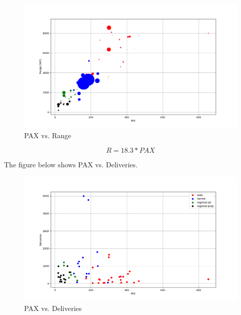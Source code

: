 \documentclass[12pt]{article} %
\begin{document}
\begin{figure}[h]
\begin{center}
\includegraphics[width=1\textwidth]{pax_v_range}
\end{center}
\caption{PAX vs. Range}
\end{figure}

\begin{equation} \label{eq:1}
R = 18.3*PAX
\end{equation}

The figure below shows PAX vs. Deliveries.

\begin{figure}[h]
\begin{center}
\includegraphics[width=1\textwidth]{pax_v_deliveries}
\end{center}
\caption{PAX vs. Deliveries}
\end{figure}
\end{document}
